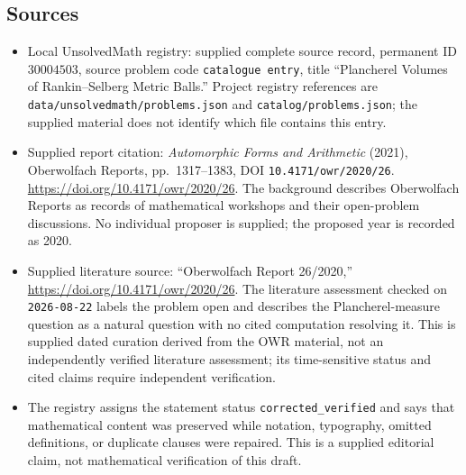 \documentclass[11pt]{article}
\begin{document}
\subsection{Sources}
\begin{itemize}
\item Local UnsolvedMath registry: supplied complete source record, permanent ID \(30004503\), source problem code \texttt{catalogue entry}, title ``Plancherel Volumes of Rankin--Selberg Metric Balls.'' Project registry references are \texttt{data/unsolvedmath/problems.json} and \texttt{catalog/problems.json}; the supplied material does not identify which file contains this entry.
\item Supplied report citation: \emph{Automorphic Forms and Arithmetic} (2021), Oberwolfach Reports, pp.~1317--1383, DOI \texttt{10.4171/owr/2020/26}. \url{https://doi.org/10.4171/owr/2020/26}. The background describes Oberwolfach Reports as records of mathematical workshops and their open-problem discussions. No individual proposer is supplied; the proposed year is recorded as 2020.
\item Supplied literature source: ``Oberwolfach Report 26/2020,'' \url{https://doi.org/10.4171/owr/2020/26}. The literature assessment checked on \texttt{2026-08-22} labels the problem open and describes the Plancherel-measure question as a natural question with no cited computation resolving it. This is supplied dated curation derived from the OWR material, not an independently verified literature assessment; its time-sensitive status and cited claims require independent verification.
\item The registry assigns the statement status \texttt{corrected\_verified} and says that mathematical content was preserved while notation, typography, omitted definitions, or duplicate clauses were repaired. This is a supplied editorial claim, not mathematical verification of this draft.
\end{itemize}
\end{document}
